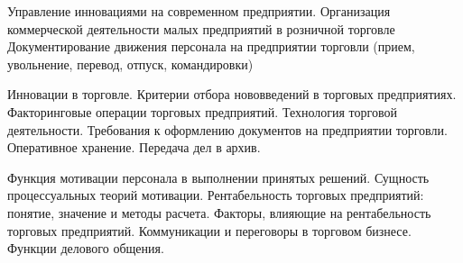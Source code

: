 \documentclass[
	11pt,
	a4paper,
	]
	{article}
\begin{document}
\bigskip

\noindent{} 
	{
		Управление инновациями на современном предприятии.
	}{
		Организация коммерческой деятельности малых предприятий в розничной торговле
	}{
		Документирование движения персонала на предприятии торговли (прием, увольнение, перевод, отпуск, командировки)
	}

\bigskip

\noindent{} 
	{
		Инновации в торговле. Критерии отбора нововведений в торговых предприятиях.
	}{
		Факторинговые операции торговых предприятий. Технология торговой деятельности.
	}{
		Требования к оформлению документов на предприятии торговли. Оперативное хранение. Передача дел в архив.
	}

\bigskip

\noindent{} 
	{
		Функция мотивации персонала в выполнении принятых решений. Сущность процессуальных теорий мотивации.
	}{
		Рентабельность торговых предприятий: понятие, значение и методы расчета. Факторы, влияющие на рентабельность торговых предприятий.
	}{
		Коммуникации и переговоры в торговом бизнесе. Функции делового общения.
	}

\bigskip
\end{document}
